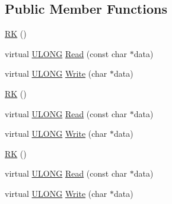 \subsection*{Public Member Functions}
\begin{DoxyCompactItemize}
\item 
\hyperlink{struct_y_excel_1_1_worksheet_1_1_cell_table_1_1_row_block_1_1_cell_block_1_1_r_k_a599a8a4080a75560ea9c8ff9d1145d41}{R\+K} ()
\item 
virtual \hyperlink{_basic_excel_8hpp_abe09d1bea023be6a07cbadde8e955435}{U\+L\+O\+N\+G} \hyperlink{struct_y_excel_1_1_worksheet_1_1_cell_table_1_1_row_block_1_1_cell_block_1_1_r_k_a95ac3955c494bab26e52ff03fc881237}{Read} (const char $\ast$data)
\item 
virtual \hyperlink{_basic_excel_8hpp_abe09d1bea023be6a07cbadde8e955435}{U\+L\+O\+N\+G} \hyperlink{struct_y_excel_1_1_worksheet_1_1_cell_table_1_1_row_block_1_1_cell_block_1_1_r_k_ab16a2188d6572ee9a3e2af3cc8cce0b3}{Write} (char $\ast$data)
\item 
\hyperlink{struct_y_excel_1_1_worksheet_1_1_cell_table_1_1_row_block_1_1_cell_block_1_1_r_k_a599a8a4080a75560ea9c8ff9d1145d41}{R\+K} ()
\item 
virtual \hyperlink{_basic_excel_8hpp_abe09d1bea023be6a07cbadde8e955435}{U\+L\+O\+N\+G} \hyperlink{struct_y_excel_1_1_worksheet_1_1_cell_table_1_1_row_block_1_1_cell_block_1_1_r_k_a8bb8e5386a72b9ef5f641dca45ee0f2e}{Read} (const char $\ast$data)
\item 
virtual \hyperlink{_basic_excel_8hpp_abe09d1bea023be6a07cbadde8e955435}{U\+L\+O\+N\+G} \hyperlink{struct_y_excel_1_1_worksheet_1_1_cell_table_1_1_row_block_1_1_cell_block_1_1_r_k_ac840a75a44576c0e8598eb6346c614cc}{Write} (char $\ast$data)
\item 
\hyperlink{struct_y_excel_1_1_worksheet_1_1_cell_table_1_1_row_block_1_1_cell_block_1_1_r_k_a599a8a4080a75560ea9c8ff9d1145d41}{R\+K} ()
\item 
virtual \hyperlink{_basic_excel_8hpp_abe09d1bea023be6a07cbadde8e955435}{U\+L\+O\+N\+G} \hyperlink{struct_y_excel_1_1_worksheet_1_1_cell_table_1_1_row_block_1_1_cell_block_1_1_r_k_a8bb8e5386a72b9ef5f641dca45ee0f2e}{Read} (const char $\ast$data)
\item 
virtual \hyperlink{_basic_excel_8hpp_abe09d1bea023be6a07cbadde8e955435}{U\+L\+O\+N\+G} \hyperlink{struct_y_excel_1_1_worksheet_1_1_cell_table_1_1_row_block_1_1_cell_block_1_1_r_k_ac840a75a44576c0e8598eb6346c614cc}{Write} (char $\ast$data)
\end{DoxyCompactItemize}
